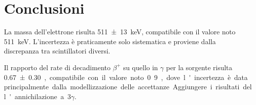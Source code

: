 \section{Conclusioni}

La massa dell'elettrone risulta \SI{511(13)}{keV},
compatibile con il valore noto \SI{511}{keV}.
L'incertezza è praticamente solo sistematica e proviene dalla discrepanza tra scintillatori diversi.

Il rapporto del rate di decadimento $\beta^+$ su quello in $\gamma$ per la sorgente \na{}
risulta \SI{0.67 \pm 0.30}, compatibile con il valore noto 0.9,
dove l'incertezza è data principalmente dalla modellizzazione delle accettanze.

Aggiungere i risultati dell'annichilazione a 3$\gamma$.
